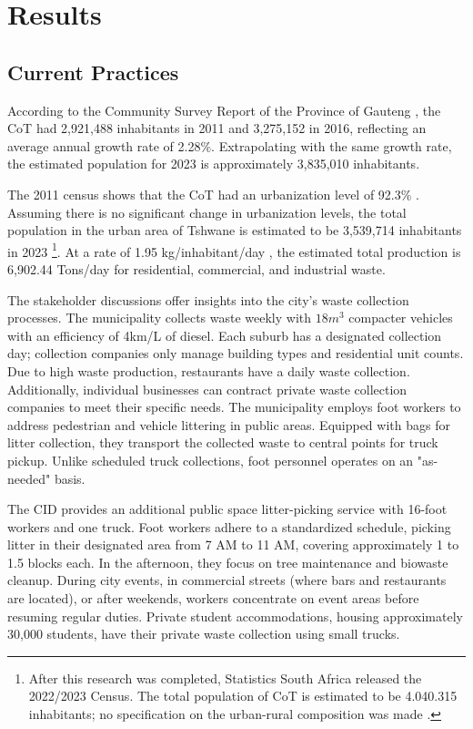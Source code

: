 \documentclass[authoryear,preprint,review,doubleblind, 12pt]{elsarticle}
\begin{document}
    \section{Results}
    \subsection{Current Practices}
According to the Community Survey Report of the Province of Gauteng \citep{africaProvincialProfileGauteng2018}, the CoT had 2,921,488 inhabitants in 2011 and 3,275,152 in 2016, reflecting an average annual growth rate of 2.28\%. Extrapolating with the same growth rate, the estimated population for 2023 is approximately 3,835,010 inhabitants.

 The 2011 census shows that the CoT had an urbanization level of 92.3\% \citep{africaCensus20112012}. Assuming there is no significant change in urbanization levels, the total population in the urban area of Tshwane is estimated to be 3,539,714 inhabitants in 2023 \footnote{After this research was completed, Statistics South Africa released the 2022/2023 Census. The total population of CoT is estimated to be 4.040.315 inhabitants; no specification on the urban-rural composition was made \citep{statisticssouthafricaCensus202223}.
 }. At a rate of 1.95 kg/inhabitant/day \citep{tshwaneCityTshwane20222022}, the estimated total production is 6,902.44 Tons/day for residential, commercial, and industrial waste.

The stakeholder discussions offer insights into the city's waste collection processes. The municipality collects waste weekly with $18m^3$ compacter vehicles with an efficiency of 4km/L of diesel. Each suburb has a designated collection day; collection companies only manage building types and residential unit counts. Due to high waste production, restaurants have a daily waste collection. Additionally, individual businesses can contract private waste collection companies to meet their specific needs. The municipality employs foot workers to address pedestrian and vehicle littering in public areas. Equipped with bags for litter collection, they transport the collected waste to central points for truck pickup. Unlike scheduled truck collections, foot personnel operates on an "as-needed" basis.

The CID provides an additional public space litter-picking service with 16-foot workers and one truck. Foot workers adhere to a standardized schedule, picking litter in their designated area from 7 AM to 11 AM, covering approximately 1 to 1.5 blocks each. In the afternoon, they focus on tree maintenance and biowaste cleanup. During city events, in commercial streets (where bars and restaurants are located), or after weekends, workers concentrate on event areas before resuming regular duties. Private student accommodations, housing approximately 30,000 students, have their private waste collection using small trucks.
\end{document}
